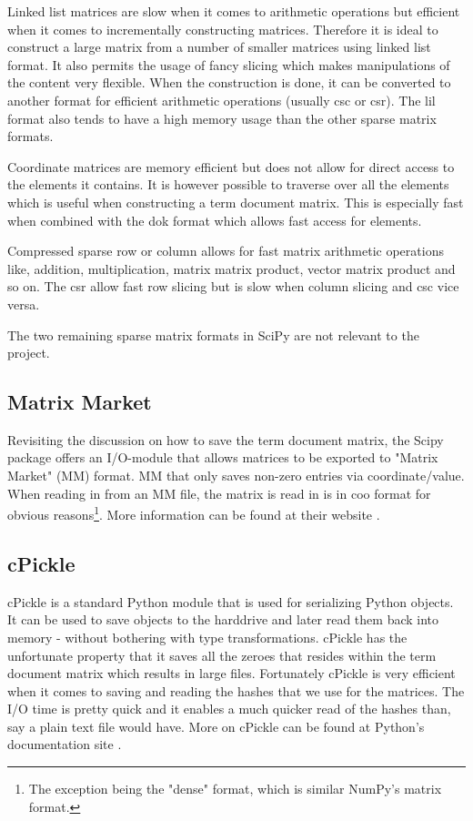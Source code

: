 Linked list matrices are slow when it comes to arithmetic
operations but efficient when it comes to incrementally constructing
matrices. Therefore it is ideal to construct a large matrix from a
number of smaller matrices using linked list format. It also permits
the usage of fancy slicing which makes manipulations of the content
very flexible. When the construction is done, it can be converted to
another format for efficient arithmetic operations (usually csc or
csr). The lil format also tends to have a high memory usage than the
other sparse matrix formats.

Coordinate matrices are memory efficient but does not allow for
direct access to the elements it contains. It is however possible to
traverse over all the elements which is useful when constructing a
term document matrix. This is especially fast when combined with the
dok format which allows fast access for elements.

Compressed sparse row or column allows for fast matrix
arithmetic operations like, addition, multiplication, matrix matrix
product, vector matrix product and so on. The csr allow fast row
slicing but is slow when column slicing and csc vice versa.

The two remaining sparse matrix formats in SciPy are not relevant to the
project.

\subsection{Matrix Market\label{MatrixMarket}}

Revisiting the discussion on how to save the term document matrix, the
Scipy package \cite{SciPy} offers an I/O-module that allows matrices
to be exported to "Matrix Market" (MM) format. MM that only saves
non-zero entries via coordinate/value. When reading in from an MM
file, the matrix is read in is in coo format for obvious
reasons\footnote{The exception being the "dense" format, which is
  similar NumPy's matrix format.}. More information can be found at
their website \cite{MatrixMarket}.

\subsection{cPickle}

cPickle is a standard Python module that is used for serializing
Python objects. It can be used to save objects to the harddrive and
later read them back into memory - without bothering with type
transformations. cPickle has the unfortunate property that it saves
all the zeroes that resides within the term document matrix which
results in large files. Fortunately cPickle is very efficient when it
comes to saving and reading the hashes that we use for the
matrices. The I/O time is pretty quick and it enables a much quicker
read of the hashes than, say a plain text file would have. More on
cPickle can be found at Python's documentation site
\cite{cPicklePython}.

